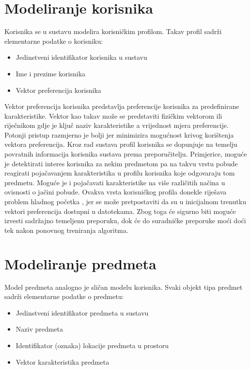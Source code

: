 \documentclass[times, utf8, diplomski, numeric]{fer}
\begin{document}
\section{Modeliranje korisnika}
Korisnika se u sustavu modelira korisničkim profilom. Takav profil sadrži
elementarne podatke o korisniku:
\begin{itemize}
  \item Jedinstveni identifikator korisnika u sustavu
  \item Ime i prezime korisnika
  \item Vektor preferencija korisnika
\end{itemize}

Vektor preferencija korisnika predstavlja preferencije korisnika za
predefinirane karakteristike. Vektor kao takav može se predstaviti fizičkim
vektorom ili riječnikom gdje je ključ naziv karakteristike a vrijednost mjera
preferencije. Potonji pristup razmjerno je bolji jer minimizira mogućnost krivog
korištenja vektora preferencija.
Kroz rad sustava profil korisnika se dopunjuje na temelju povratnih informacija
korisnika sustava prema preporučitelju. Primjerice, moguće je detektirati
interes korisnika za nekim predmetom pa na takvu vrstu pobude reagirati
pojačavanjem karakteristika u profilu korisnika koje odgovaraju tom predmetu.
Moguće je i pojačavati karakteristike na više različitih načina u ovisnosti o
jačini pobude.
Ovakva vrsta korisničkog profila donekle riješava problem hladnog početka
, jer se može pretpostaviti da su u inicijalnom trenutku
vektori preferencija dostupni u datotekama. Zbog toga će sigurno biti moguće
izvesti sadržajno temeljenu preporuku, dok će do suradničke preporuke moći doći
tek nakon ponovnog treniranja algoritma.

\section{Modeliranje predmeta}

Model predmeta analogno je sličan modelu korisnika. Svaki objekt tipa predmet
sadrži elementarne podatke o predmetu:
\begin{itemize}
  \item Jedinstveni identifikator predmeta u sustavu
  \item Naziv predmeta
  \item Identifikator (oznaka) lokacije predmeta u prostoru
  \item Vektor karakteristika predmeta
\end{itemize}
\end{document}
